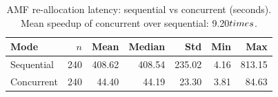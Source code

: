 \begin{table}[htbp]
\centering
\caption{AMF re-allocation latency: sequential vs concurrent (seconds). Mean speedup of concurrent over sequential: 9.20$\\times$.}
\label{tab:comparison}
\begin{tabular}{lrrrrrr}
\hline
Mode & $n$ & Mean & Median & Std & Min & Max \\
\hline
Sequential & 240 & 408.62 & 408.54 & 235.02 & 4.16 & 813.15 \\
Concurrent & 240 & 44.40 & 44.19 & 23.30 & 3.81 & 84.63 \\
\hline
\end{tabular}
\end{table}
